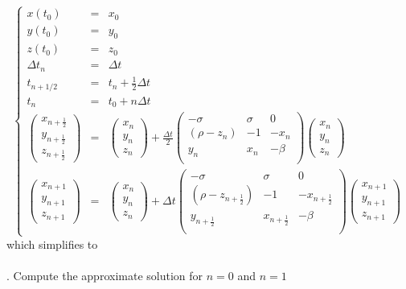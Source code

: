 \documentclass[12pt,a4paper]{article}
\begin{document}
$$
\left \{
\begin{array}{rcl}
x(t_0)&=&x_0\\
y(t_0)&=&y_0\\
z(t_0)&=&z_0 \\
\Delta t_{n}&=&\Delta t\\
t_{n+1/2} &=& t_n+\frac{1}{2}\Delta t \\
t_{n} &=& t_0+n\Delta t \\
\begin{pmatrix}
x_{n+\frac{1}{2}} \\ 
y_{n+\frac{1}{2}} \\ 
z_{n+\frac{1}{2}}
\end{pmatrix} &=&\begin{pmatrix}
x_n \\ 
y_n \\ 
z_n
\end{pmatrix} +\frac{\Delta t }{2}\begin{pmatrix}
-\sigma & \sigma & 0 \\ 
(\rho - z_n) & -1 & -x_n \\ 
y_n & x_n & -\beta \\ 
\end{pmatrix}\begin{pmatrix}
x_n \\ 
y_n \\ 
z_n
\end{pmatrix}  \\
\begin{pmatrix}
x_{n+1} \\ 
y_{n+1}\\ 
z_{n+1}
\end{pmatrix} &=&\begin{pmatrix}
x_n \\ 
y_n \\ 
z_n
\end{pmatrix} +\Delta t \begin{pmatrix}
-\sigma & \sigma & 0 \\ 
(\rho - z_{n+\frac{1}{2}}) & -1 & -x_{n+\frac{1}{2}} \\ 
y_{n+\frac{1}{2}} & x_{n+\frac{1}{2}} & -\beta \\ 
\end{pmatrix}\begin{pmatrix}
x_{n+1} \\ 
y_{n+1}\\ 
z_{n+1}
\end{pmatrix}
\end{array}
\right.
$$
which simplifies to\\\\

 
. Compute the approximate solution for $n=0$ and $n=1$
\end{document}
